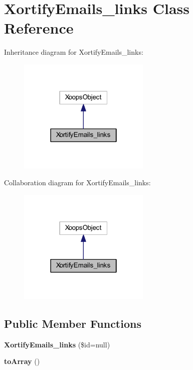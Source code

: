 \hypertarget{class_xortify_emails__links}{\section{Xortify\-Emails\-\_\-links Class Reference}
\label{class_xortify_emails__links}
}


Inheritance diagram for Xortify\-Emails\-\_\-links\-:
\nopagebreak
\begin{figure}[H]
\begin{center}
\leavevmode
\includegraphics[width=178pt]{class_xortify_emails__links__inherit__graph}
\end{center}
\end{figure}


Collaboration diagram for Xortify\-Emails\-\_\-links\-:
\nopagebreak
\begin{figure}[H]
\begin{center}
\leavevmode
\includegraphics[width=178pt]{class_xortify_emails__links__coll__graph}
\end{center}
\end{figure}
\subsection*{Public Member Functions}
\begin{DoxyCompactItemize}
\item 
\hypertarget{class_xortify_emails__links_a92acc301077c8e3b54e83301b2f20861}{{\bfseries Xortify\-Emails\-\_\-links} (\$id=null)}\label{class_xortify_emails__links_a92acc301077c8e3b54e83301b2f20861}

\item 
\hypertarget{class_xortify_emails__links_a658defb34762c8f40085aec87e16ba1a}{{\bfseries to\-Array} ()}\label{class_xortify_emails__links_a658defb34762c8f40085aec87e16ba1a}

\end{DoxyCompactItemize}


